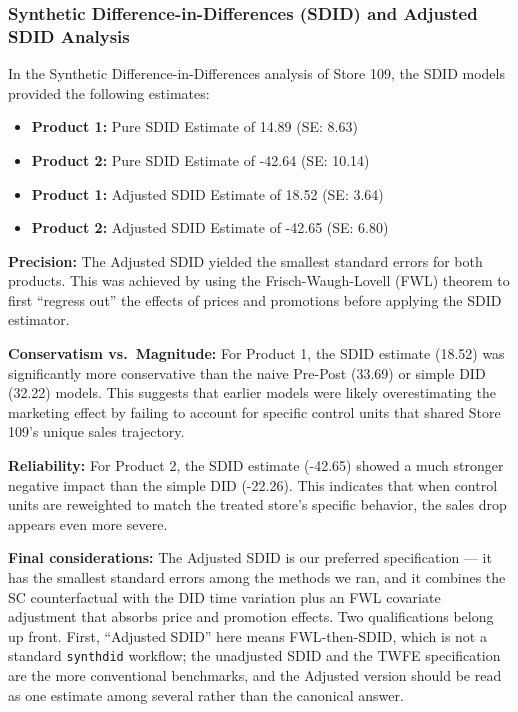 \documentclass[
  letterpaper,
  DIV=11,
  numbers=noendperiod]{scrartcl}
\providecommand{\tightlist}{%
  \setlength{\itemsep}{0pt}\setlength{\parskip}{0pt}}
\begin{document}
\subsubsection{Synthetic Difference-in-Differences (SDID) and Adjusted
SDID
Analysis}\label{synthetic-difference-in-differences-sdid-and-adjusted-sdid-analysis}

In the Synthetic Difference-in-Differences analysis of Store 109, the
SDID models provided the following estimates:

\begin{itemize}
\tightlist
\item
  \textbf{Product 1:} Pure SDID Estimate of 14.89 (SE: 8.63)
\item
  \textbf{Product 2:} Pure SDID Estimate of -42.64 (SE: 10.14)
\item
  \textbf{Product 1:} Adjusted SDID Estimate of 18.52 (SE: 3.64)
\item
  \textbf{Product 2:} Adjusted SDID Estimate of -42.65 (SE: 6.80)
\end{itemize}

\textbf{Precision:} The Adjusted SDID yielded the smallest standard
errors for both products. This was achieved by using the
Frisch-Waugh-Lovell (FWL) theorem to first ``regress out'' the effects
of prices and promotions before applying the SDID estimator.

\textbf{Conservatism vs.~Magnitude:} For Product 1, the SDID estimate
(18.52) was significantly more conservative than the naive Pre-Post
(33.69) or simple DID (32.22) models. This suggests that earlier models
were likely overestimating the marketing effect by failing to account
for specific control units that shared Store 109's unique sales
trajectory.

\textbf{Reliability:} For Product 2, the SDID estimate (-42.65) showed a
much stronger negative impact than the simple DID (-22.26). This
indicates that when control units are reweighted to match the treated
store's specific behavior, the sales drop appears even more severe.

\textbf{Final considerations:} The Adjusted SDID is our preferred
specification --- it has the smallest standard errors among the methods
we ran, and it combines the SC counterfactual with the DID time
variation plus an FWL covariate adjustment that absorbs price and
promotion effects. Two qualifications belong up front. First, ``Adjusted
SDID'' here means FWL-then-SDID, which is not a standard
\texttt{synthdid} workflow; the unadjusted SDID and the TWFE
specification are the more conventional benchmarks, and the Adjusted
version should be read as one estimate among several rather than the
canonical answer.
\end{document}
